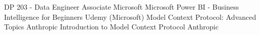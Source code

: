 DP 203 - Data Engineer Associate \hfill Microsoft 
\newline Microsoft Power BI - Business Intelligence for Beginners \hfill Udemy (Microsoft) 
\newline Model Context Protocol: Advanced Topics \hfill  Anthropic 
\newline Introduction to Model Context Protocol \hfill  Anthropic 